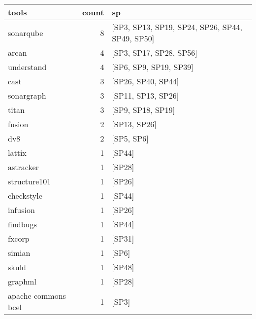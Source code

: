 \begin{tabular}{lrl}
\toprule
               tools &  count &                                                     sp \\
\midrule
           sonarqube &      8 &        [SP3, SP13, SP19, SP24, SP26, SP44, SP49, SP50] \\
               arcan &      4 &                                [SP3, SP17, SP28, SP56] \\
          understand &      4 &                                 [SP6, SP9, SP19, SP39] \\
                cast &      3 &                                     [SP26, SP40, SP44] \\
          sonargraph &      3 &                                     [SP11, SP13, SP26] \\
               titan &      3 &                                      [SP9, SP18, SP19] \\
              fusion &      2 &                                           [SP13, SP26] \\
                 dv8 &      2 &                                             [SP5, SP6] \\
              lattix &      1 &                                                 [SP44] \\
           astracker &      1 &                                                 [SP28] \\
        structure101 &      1 &                                                 [SP26] \\
          checkstyle &      1 &                                                 [SP44] \\
            infusion &      1 &                                                 [SP26] \\
            findbugs &      1 &                                                 [SP44] \\
              fxcorp &      1 &                                                 [SP31] \\
              simian &      1 &                                                  [SP6] \\
               skuld &      1 &                                                 [SP48] \\
             graphml &      1 &                                                 [SP28] \\
 apache commons bcel &      1 &                                                  [SP3] \\

\end{tabular}
